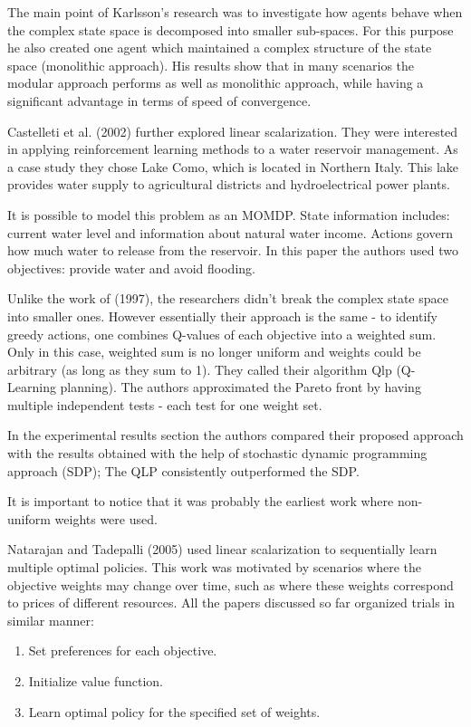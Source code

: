 The main point of Karlsson's research was to investigate how agents behave when the complex state space is decomposed into smaller sub-spaces. For this purpose he also created one agent which maintained a complex structure of the state space (monolithic approach). His results show that in many scenarios the modular approach performs as well as monolithic approach, while having a significant advantage in terms of speed of convergence.

Castelleti et al. (2002)\nocite{castelletti2002reinforcement} further explored linear scalarization. They were interested in applying reinforcement learning methods to a water reservoir management. As a case study they chose Lake Como, which is located in Northern Italy. This lake provides water supply to agricultural districts and hydroelectrical power plants.

It is possible to model this problem as an MOMDP. State information includes: current water level and information about natural water income. Actions govern how much water to release from the reservoir. In this paper the authors used two objectives: provide water and avoid flooding.

Unlike the work of (1997)\nocite{Karlsson97learningto}, the researchers didn't break the complex state space into smaller ones. However essentially their approach is the same - to identify greedy actions, one combines Q-values of each objective into a weighted sum. Only in this case, weighted sum is no longer uniform and weights could be arbitrary (as long as they sum to 1). They called their algorithm Qlp (Q-Learning planning). The authors approximated the Pareto front by having multiple independent tests - each test for one weight set.

In the experimental results section the authors compared their proposed approach with the results obtained with the help of stochastic dynamic programming approach (SDP); The QLP consistently outperformed the SDP.

It is important to notice that it was probably the earliest work where non-uniform weights were used.

Natarajan and Tadepalli (2005)\nocite{natarajan2005dynamic} used linear scalarization to sequentially learn multiple optimal policies. This work was motivated by scenarios where the objective weights may change over time, such as where these weights correspond to prices of different resources. All the papers discussed so far organized trials in similar manner:
\begin{enumerate}
  \item Set preferences for each objective.
  \item Initialize value function.
  \item Learn optimal policy for the specified set of weights.
\end{enumerate}

